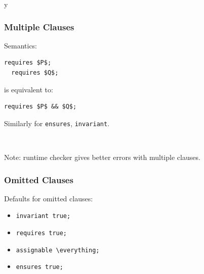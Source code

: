 \if y\MAKEHANDOUTS \documentclass[compress,landscape,handout]{beamer}
\begin{document}
\begin{frame}[fragile]
\frametitle{Multiple Clauses}

Semantics:

\begin{lstlisting}[mathescape=true]
  requires $P$;
  requires $Q$;
\end{lstlisting}

is equivalent to:

\begin{lstlisting}[mathescape=true]
  requires $P$ && $Q$;
\end{lstlisting}

Similarly for \lstinline!ensures!, \lstinline!invariant!.

~

Note: runtime checker gives better errors with multiple clauses.

\end{frame}

\begin{frame}[fragile]
\frametitle{Omitted Clauses}

Defaults for omitted clauses:
\begin{itemize}
\item
\lstinline!invariant true;!

\item
\lstinline!requires true;!

\item
\lstinline!assignable \everything;!

\item
\lstinline!ensures true;!
\end{itemize}
\end{frame}
\end{document}
